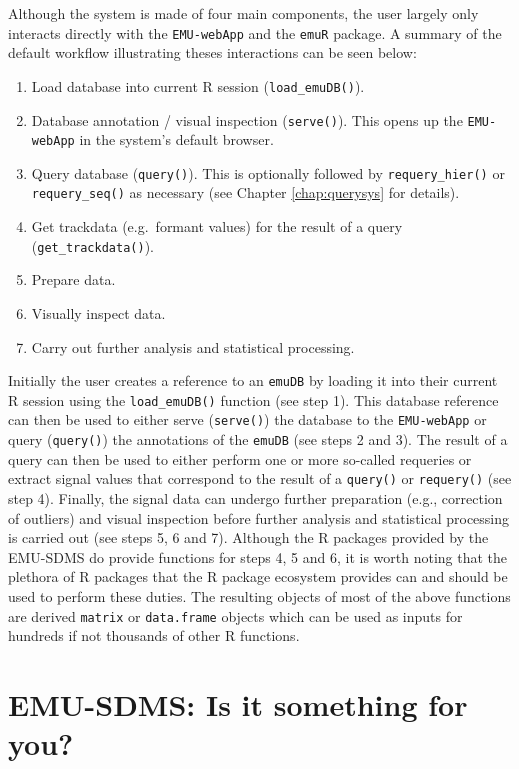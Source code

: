 \documentclass[]{book}
\providecommand{\tightlist}{%
  \setlength{\itemsep}{0pt}\setlength{\parskip}{0pt}}
\begin{document}
Although the system is made of four main components, the user largely only interacts directly with the \texttt{EMU-webApp} and the \texttt{emuR} package. A summary of the default workflow illustrating theses interactions can be seen below:

\begin{enumerate}
\def\labelenumi{\arabic{enumi}.}
\tightlist
\item
  Load database into current R session (\texttt{load\_emuDB()}).
\item
  Database annotation / visual inspection (\texttt{serve()}). This opens up the \texttt{EMU-webApp} in the system's default browser.
\item
  Query database (\texttt{query()}). This is optionally followed by \texttt{requery\_hier()} or \texttt{requery\_seq()} as necessary (see Chapter \ref{chap:querysys} for details).
\item
  Get trackdata (e.g.~formant values) for the result of a query (\texttt{get\_trackdata()}).
\item
  Prepare data.
\item
  Visually inspect data.
\item
  Carry out further analysis and statistical processing.
\end{enumerate}

Initially the user creates a reference to an \texttt{emuDB} by loading it into their current R session using the \texttt{load\_emuDB()} function (see step 1). This database reference can then be used to either serve (\texttt{serve()}) the database to the \texttt{EMU-webApp} or query (\texttt{query()}) the annotations of the \texttt{emuDB} (see steps 2 and 3). The result of a query can then be used to either perform one or more so-called requeries or extract signal values that correspond to the result of a \texttt{query()} or \texttt{requery()} (see step 4). Finally, the signal data can undergo further preparation (e.g., correction of outliers) and visual inspection before further analysis and statistical processing is carried out (see steps 5, 6 and 7). Although the R packages provided by the EMU-SDMS do provide functions for steps 4, 5 and 6, it is worth noting that the plethora of R packages that the R package ecosystem provides can and should be used to perform these duties. The resulting objects of most of the above functions are derived \texttt{matrix} or \texttt{data.frame} objects which can be used as inputs for hundreds if not thousands of other R functions.

\hypertarget{emu-sdms-is-it-something-for-you}{%
\section{EMU-SDMS: Is it something for you?}\label{emu-sdms-is-it-something-for-you}}
\end{document}
